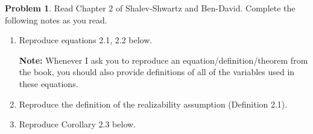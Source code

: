 \documentclass[10pt]{article}
\theoremstyle{definition}
\newtheorem{problem}{Problem}
\newcommand{\h}{\mathcal H}
\DeclareMathOperator*{\erm}{ERM}
\begin{document}
\begin{problem}
    Read Chapter 2 of Shalev-Shwartz and Ben-David.
    Complete the following notes as you read.
    \begin{enumerate}
        \item
            Reproduce equations 2.1, 2.2 below.

            \textbf{Note:}
            Whenever I ask you to reproduce an equation/definition/theorem from the book, you should also provide definitions of all of the variables used in these equations.
            \vspace{5in}

        \item
            Reproduce the definition of the realizability assumption (Definition 2.1).
            \vspace{3in}

        \item
            Reproduce Corollary 2.3 below.
            \vspace{3in}
    \end{enumerate}

\end{problem}
\end{document}
